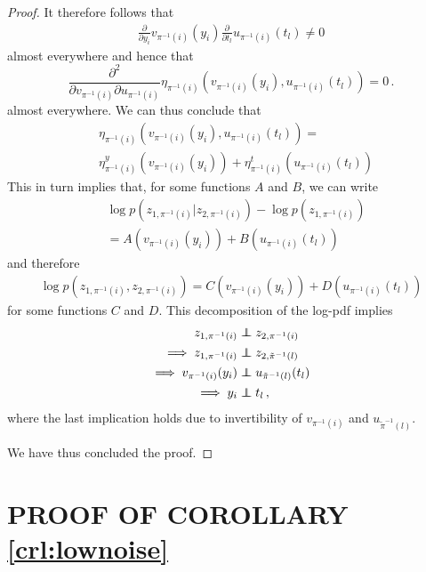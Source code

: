 \documentclass[letterpaper]{article}
\newcommand\independent{\protect\mathpalette{\protect\independenT}{\perp}}
\def\independenT#1#2{\mathrel{\rlap{$#1#2$}\mkern2mu{#1#2}}}
\theoremstyle{definition}
\begin{document}
\begin{proof}
It therefore follows that
\begin{align*}
    \frac{\partial}{\partial y_i}v_{\pi^{-1}(i)}(y_i) \frac{\partial }{\partial t_l} u_{\pi^{-1}(i)}(t_l) \neq 0
\end{align*}
almost everywhere and hence that
\begin{equation}
\frac{\partial^2}{\partial v_{\pi^{-1}(i)} \partial u_{\pi^{-1}(i)}} \eta_{\pi^{-1}(i)}(v_{\pi^{-1}(i)}(y_i), u_{\pi^{-1}(i)}(t_l)) = 0\,. \label{eq:additive_eta}
\end{equation}
almost everywhere.
We can thus conclude that
\begin{align*}
&\eta_{\pi^{-1}(i)}(v_{\pi^{-1}(i)}(y_i), u_{\pi^{-1}(i)}(t_l)) = \\ &\eta_{\pi^{-1}(i)}^y(v_{\pi^{-1}(i)}(y_i))+ \eta_{\pi^{-1}(i)}^t(u_{\pi^{-1}(i)}(t_l))
\end{align*}
This in turn implies that, for some functions $A$ and $B$, we can write
\begin{align*}
    &\log p(z_{1, \pi^{-1}(i)}|z_{2, \pi^{-1}(i)}) - \log p(z_{1, \pi^{-1}(i)}) \\ &= A(v_{\pi^{-1}(i)}(y_i)) + B(u_{\pi^{-1}(i)}(t_l))
\end{align*}
and therefore
\begin{align*}
    \log p(z_{1, \pi^{-1}(i)},z_{2, \pi^{-1}(i)}) = C(v_{\pi^{-1}(i)}(y_i)) + D(u_{\pi^{-1}(i)}(t_l))
\end{align*}
for some functions $C$ and $D$. This decomposition of the log-pdf implies
\begin{align*}
z_{1, \pi^{-1}(i)} &\independent z_{2, \pi^{-1}(i)}\\
\implies z_{1, \pi^{-1}(i)} &\independent z_{2, \tilde{\pi}^{-1}(l)}  \\
\implies v_{\pi^{-1}(i)}(y_i)  &\independent u_{\tilde{\pi}^{-1}(l)}(t_l) \\
\implies y_i  &\independent t_l \,,
\end{align*}
where the last implication holds due to invertibility of $v_{\pi^{-1}(i)}$ and $u_{\tilde{\pi}^{-1}(l)}$.

We have thus concluded the proof.

\end{proof}

\section{PROOF OF COROLLARY \ref{crl:lownoise}}
\label{appendix:thm2}
\end{document}

